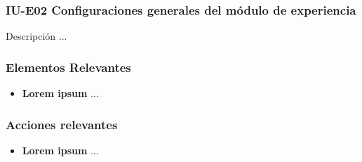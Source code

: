 
\subsubsection{IU-E02 Configuraciones generales del módulo de experiencia}

 Descripción ...


\subsubsection{Elementos Relevantes}

    \begin{itemize}
    \item {\bf Lorem ipsum}
        ...
    \end{itemize}

\subsubsection{Acciones relevantes}

    \begin{itemize}
    \item {\bf Lorem ipsum}
        ...
    \end{itemize}

\clearpage
